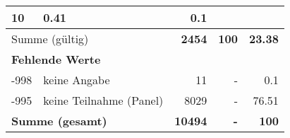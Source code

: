 \begin{longtable}{lXrrr}
       \num{10} &
       \num[round-mode=places,round-precision=2]{0.41} &
         \num[round-mode=places,round-precision=2]{0.1} \\
     \midrule
     \multicolumn{2}{l}{Summe (gültig)} &
       \textbf{\num{2454}} &
     \textbf{\num{100}} &
       \textbf{\num[round-mode=places,round-precision=2]{23.38}} \\
     \multicolumn{5}{l}{\textbf{Fehlende Werte}}\\
       -998 &
       keine Angabe &
         \num{11} &
        - &
         \num[round-mode=places,round-precision=2]{0.1} \\
       -995 &
       keine Teilnahme (Panel) &
         \num{8029} &
        - &
         \num[round-mode=places,round-precision=2]{76.51} \\
     \midrule
     \multicolumn{2}{l}{\textbf{Summe (gesamt)}} &
          \textbf{\num{10494}} &
        \textbf{-} &
        \textbf{\num{100}} \\
     \bottomrule
     \end{longtable}
     
